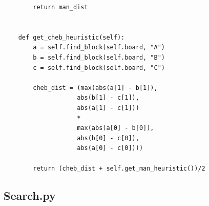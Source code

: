 \documentclass[10pt]{article}
\begin{document}
\begin{lstlisting}
        return man_dist
        
    
    def get_cheb_heuristic(self):
        a = self.find_block(self.board, "A")
        b = self.find_block(self.board, "B")
        c = self.find_block(self.board, "C")

        cheb_dist = (max(abs(a[1] - b[1]),
                    abs(b[1] - c[1]),
                    abs(a[1] - c[1])) 
                    * 
                    max(abs(a[0] - b[0]),
                    abs(b[0] - c[0]),
                    abs(a[0] - c[0])))
        
        return (cheb_dist + self.get_man_heuristic())/2
  \end{lstlisting}

  \subsection{Search.py}
\end{document}
